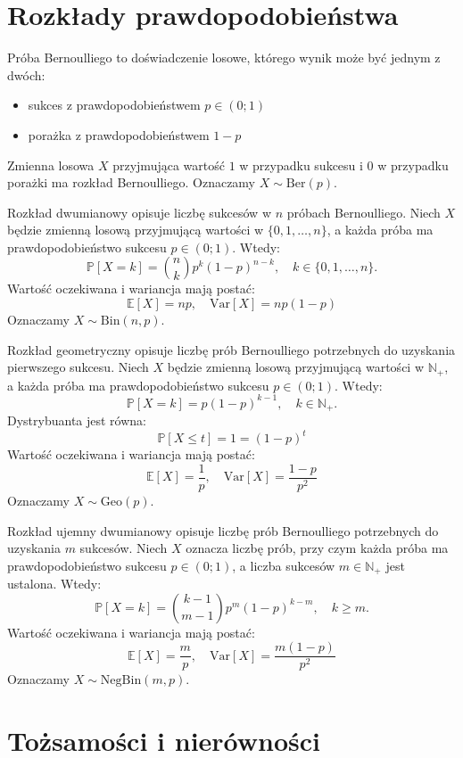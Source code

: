 \section{Rozkłady prawdopodobieństwa}

Próba Bernoulliego to doświadczenie losowe, którego wynik może być jednym z dwóch:
\begin{itemize}
    \item sukces z prawdopodobieństwem  $p \in (0;1)$
    \item porażka z prawdopodobieństwem  $1 - p$
\end{itemize}  
Zmienna losowa $X$ przyjmująca wartość $1$ w przypadku sukcesu i $0$ w przypadku porażki ma rozkład Bernoulliego. Oznaczamy $X \sim \mathrm{Ber}(p)$.
 

Rozkład dwumianowy opisuje liczbę sukcesów w $n$ próbach Bernoulliego. Niech $X$ będzie zmienną losową przyjmującą wartości w $\{0,1,\dots,n\}$, a każda próba ma prawdopodobieństwo sukcesu $p \in (0;1)$.  
Wtedy:
\[
\mathbb{P}[X = k] = \binom{n}{k}p^k(1-p)^{n-k}, \quad k \in \{0,1,\dots,n\}.
\]
Wartość oczekiwana i wariancja mają postać:
\[
    \mathbb{E}[X] = np, \quad \mathrm{Var}[X] = np(1-p)
\]
Oznaczamy $X \sim \mathrm{Bin}(n,p)$.

Rozkład geometryczny opisuje liczbę prób Bernoulliego potrzebnych do uzyskania pierwszego sukcesu.  
Niech $X$ będzie zmienną losową przyjmującą wartości w $\mathbb{N}_+$, a każda próba ma prawdopodobieństwo sukcesu $p \in (0;1)$.  
Wtedy:
\[
    \mathbb{P}[X = k] = p(1 - p)^{k-1}, \quad k \in \mathbb{N}_+.
\]
Dystrybuanta jest równa:
\[
    \mathbb{P}[X\le t] = 1 = (1-p)^t
\]
Wartość oczekiwana i wariancja mają postać:
\[
    \mathbb{E}[X] = \frac{1}{p}, \quad \mathrm{Var}[X] = \frac{1 - p}{p^2}
\]
Oznaczamy $X \sim \mathrm{Geo}(p)$.

Rozkład ujemny dwumianowy opisuje liczbę prób Bernoulliego potrzebnych do uzyskania $m$ sukcesów.  
Niech $X$ oznacza liczbę prób, przy czym każda próba ma prawdopodobieństwo sukcesu $p \in (0;1)$, a liczba sukcesów $m \in \mathbb{N}_+$ jest ustalona.  
Wtedy:
\[
\mathbb{P}[X = k] = \binom{k-1}{m-1} p^m (1 - p)^{k - m}, \quad k \ge m.
\]
Wartość oczekiwana i wariancja mają postać:
\[
    \mathbb{E}[X] = \frac{m}{p}, \quad \mathrm{Var}[X] = \frac{m(1 - p)}{p^2}
\]
Oznaczamy $X \sim \mathrm{NegBin}(m, p)$.

\section{Tożsamości i nierówności}

